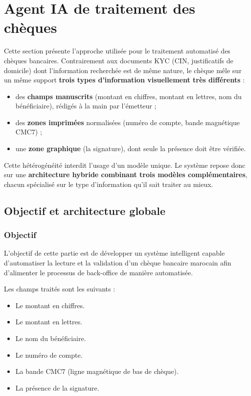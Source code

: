 \section{Agent IA de traitement des chèques}

Cette section présente l'approche utilisée pour le traitement automatisé
des chèques bancaires. Contrairement aux documents KYC (CIN, justificatifs
de domicile) dont l'information recherchée est de même nature, le chèque
mêle sur un même support \textbf{trois types d'information visuellement très
différents} :
\begin{itemize}
    \item des \textbf{champs manuscrits} (montant en chiffres, montant en
    lettres, nom du bénéficiaire), rédigés à la main par l'émetteur ;
    \item des \textbf{zones imprimées} normalisées (numéro de compte, bande
    magnétique CMC7) ;
    \item une \textbf{zone graphique} (la signature), dont seule la présence
    doit être vérifiée.
\end{itemize}

Cette hétérogénéité interdit l'usage d'un modèle unique. Le système repose
donc sur une \textbf{architecture hybride combinant trois modèles
complémentaires}, chacun spécialisé sur le type d'information qu'il sait
traiter au mieux.

\subsection*{Objectif et architecture globale}

\subsubsection{Objectif}

L'objectif de cette partie est de développer un système intelligent capable
d'automatiser la lecture et la validation d'un chèque bancaire marocain afin
d'alimenter le processus de back-office de manière automatisée.

Les champs traités sont les suivants :
\begin{itemize}
    \item Le montant en chiffres.
    \item Le montant en lettres.
    \item Le nom du bénéficiaire.
    \item Le numéro de compte.
    \item La bande CMC7 (ligne magnétique de bas de chèque).
    \item La présence de la signature.
\end{itemize}

